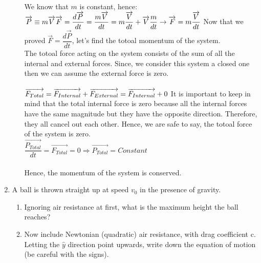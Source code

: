 \documentclass[fleqn]{article}
\begin{document}
\begin{enumerate}
\begin{enumerate}
        \textcolor{hwColor}{
          We know that $m$ is constant, hence: \\
          $
            \overrightarrow{P}\equiv m\overrightarrow{V} \\ \\
            \overrightarrow{F}=\dfrac{d\overrightarrow{P}}{dt}=\dfrac{m\overrightarrow{V}}{dt}=m\dfrac{\overrightarrow{V}}{dt}+\overrightarrow{V}\dfrac{m}{dt} \rightarrow \overrightarrow{F}=m\dfrac{\overrightarrow{V}}{dt} \\ \\
          $
          Now that we proved $\overrightarrow{F}=\dfrac{d\overrightarrow{P}}{dt}$, let's find the totoal momentum of the system. \\
          The totoal force acting on the system consists of the sum of all the internal and external forces. Since, we consider this system
          a closed one then we can assume the external force is zero. \\
          \\
          $
            \overrightarrow{F_{Total}}=\overrightarrow{F_{Internal}}+\overrightarrow{F_{External}}=\overrightarrow{F_{Internal}}+0 \\ \\
          $
          It is important to keep in mind that the total internal force is zero because all the internal forces have the same magnitude but they have the opposite direction. 
          Therefore, they all cancel out each other. Hence, we are safe to say, the totoal force of the system is zero. \\
          $
            \dfrac{\overrightarrow{P_{Total}}}{dt}=\overrightarrow{F_{Total}}=0 \Rightarrow \overrightarrow{P_{Total}}=Constant 
          $ \\
          \\
          Hence, the momentum of the system is conserved.
        }

    \end{enumerate}

    \item A ball is thrown straight up at speed $v_0$ in the presence of gravity.
    \begin{enumerate}
      \item Ignoring air resistance at first, what is the maximum height the
      ball reaches?
      \item Now include Newtonian (quadratic) air resistance, with drag coefficient c. Letting the $\hat{y}$ direction point upwards, write down the
      equation of motion (be careful with the signs).


\end{enumerate}
\end{enumerate}
\end{document}
